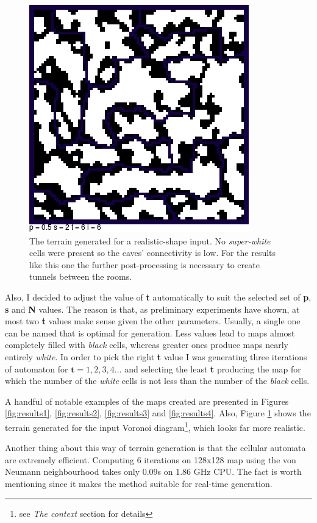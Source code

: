 \documentclass[a4paper, 11pt]{article} %
\begin{document}
\begin{figure}
	\centering
	\includegraphics[scale=0.5]{voronoi}
	\caption{The terrain generated for a realistic-shape input. No \emph{super-white} cells were present so the caves' connectivity is low. For the results like this one the further post-processing is necessary to create tunnels between the rooms.}
	\label{fig:voronoi}
\end{figure}

Also, I decided to adjust the value of \textbf{t} automatically to suit the selected set of \textbf{p}, \textbf{s} and \textbf{N} values. The reason is that, as preliminary experiments have shown, at most two \textbf{t} values make sense given the other parameters. Usually, a single one can be named that is optimal for generation. Less values lead to maps almost completely filled with \emph{black} cells, whereas greater ones produce maps nearly entirely \emph{white}. In order to pick the right \textbf{t} value I was generating three iterations of automaton for $\textbf{t} = 1,2,3,4...$ and selecting the least \textbf{t} producing the map for which the number of the \emph{white} cells is not less than the number of the \emph{black} cells.

A handful of notable examples of the maps created are presented in Figures \ref{fig:results1}, \ref{fig:results2}, \ref{fig:results3} and \ref{fig:results4}. Also, Figure \ref{fig:voronoi} shows the terrain generated for the input Voronoi diagram\footnote{see \emph{The context} section for details}, which looks far more realistic.


Another thing about this way of terrain generation is that the cellular automata are extremely efficient. Computing 6 iterations on 128x128 map using the von Neumann neighbourhood takes only 0.09s on 1.86 GHz CPU. The fact is worth mentioning since it makes the method suitable for real-time generation. 
\end{document}
